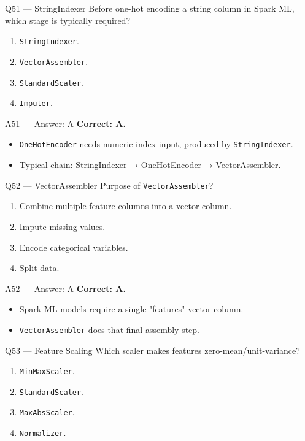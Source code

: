 \documentclass[aspectratio=169,10pt]{beamer}
\begin{document}
	\begin{frame}{Q51 — StringIndexer}
		Before one-hot encoding a string column in Spark ML, which stage is typically required?
		\begin{enumerate}[label=\Alph*.]
			\item \texttt{StringIndexer}.
			\item \texttt{VectorAssembler}.
			\item \texttt{StandardScaler}.
			\item \texttt{Imputer}.
		\end{enumerate}
	\end{frame}
	
	\begin{frame}{A51 — Answer: A}
		\textbf{Correct: A.}
		\begin{itemize}
			\item \texttt{OneHotEncoder} needs numeric index input, produced by \texttt{StringIndexer}.
			\item Typical chain: StringIndexer → OneHotEncoder → VectorAssembler.
		\end{itemize}
	\end{frame}
	
	\begin{frame}{Q52 — VectorAssembler}
		Purpose of \texttt{VectorAssembler}?
		\begin{enumerate}[label=\Alph*.]
			\item Combine multiple feature columns into a vector column.
			\item Impute missing values.
			\item Encode categorical variables.
			\item Split data.
		\end{enumerate}
	\end{frame}
	
	\begin{frame}{A52 — Answer: A}
		\textbf{Correct: A.}
		\begin{itemize}
			\item Spark ML models require a single "features" vector column.
			\item \texttt{VectorAssembler} does that final assembly step.
		\end{itemize}
	\end{frame}
	
	\begin{frame}{Q53 — Feature Scaling}
		Which scaler makes features zero-mean/unit-variance?
		\begin{enumerate}[label=\Alph*.]
			\item \texttt{MinMaxScaler}.
			\item \texttt{StandardScaler}.
			\item \texttt{MaxAbsScaler}.
			\item \texttt{Normalizer}.
		\end{enumerate}
	\end{frame}
	
\end{document}
